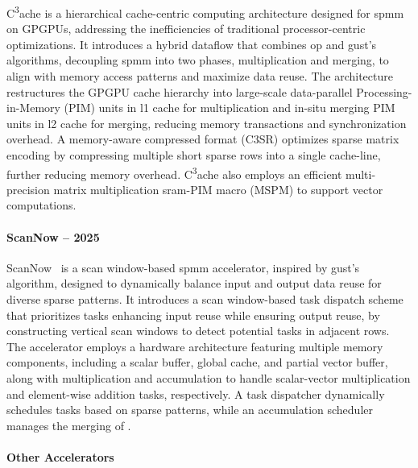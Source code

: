 C\textsuperscript{3}ache is a hierarchical cache-centric computing architecture designed for \acrshort{spmm} on GPGPUs, addressing the inefficiencies of traditional processor-centric optimizations.
It introduces a hybrid dataflow that combines \acrlong{op} and \acrlong{gust}'s algorithms, decoupling \acrshort{spmm} into two phases, multiplication and merging, to align with memory access patterns and maximize data reuse.
The architecture restructures the GPGPU cache hierarchy into large-scale data-parallel Processing-in-Memory (PIM) units in \acrshort{l1} cache for multiplication and in-situ merging PIM units in \acrshort{l2} cache for merging, reducing memory transactions and synchronization overhead.
A memory-aware compressed format (C3SR) optimizes sparse matrix encoding by compressing multiple short sparse rows into a single cache-line, further reducing memory overhead.
C\textsuperscript{3}ache also employs an efficient multi-precision matrix multiplication \acrshort{sram}-PIM macro (MSPM) to support vector computations.%

\paragraph{ScanNow -- 2025}

ScanNow~\cite{Ma2025_ScanNow} is a scan window-based \acrshort{spmm} accelerator, inspired by \acrlong{gust}'s algorithm, designed to dynamically balance input and output data reuse for diverse sparse patterns.
It introduces a scan window-based task dispatch scheme that prioritizes tasks enhancing input reuse while ensuring output reuse, by constructing vertical scan windows to detect potential tasks in adjacent rows.
The accelerator employs a hardware architecture featuring multiple memory components, including a scalar buffer, global cache, and partial vector buffer, along with multiplication  and accumulation  to handle scalar-vector multiplication and element-wise addition tasks, respectively.
A task dispatcher dynamically schedules tasks based on sparse patterns, while an accumulation scheduler manages the merging of .

\paragraph{Other Accelerators}

